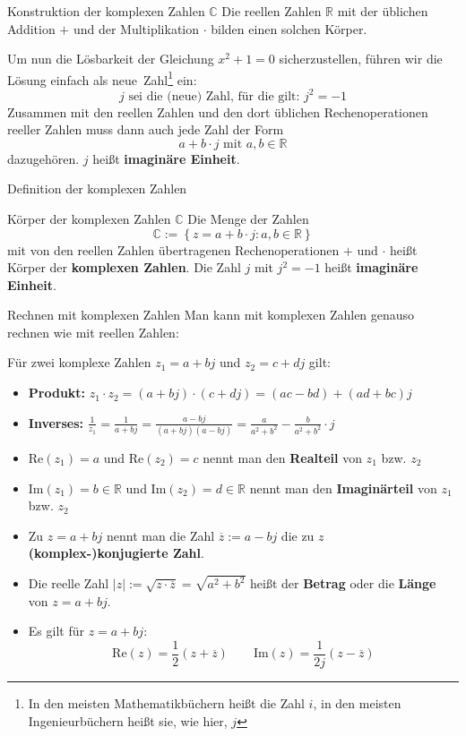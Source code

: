 \begin{frame}{Konstruktion der komplexen Zahlen $\mathbb{C}$}
	Die reellen Zahlen $\mathbb{R}$ mit der üblichen Addition $+$ und der Multiplikation $\cdot$ bilden einen solchen Körper.
	
	Um nun die Lösbarkeit der Gleichung $x^{2}+1=0$ 	sicherzustellen, führen wir die Lösung einfach als \glqq neue\grqq\, Zahl\footnote{In den meisten Mathematikbüchern heißt die Zahl $i$, in den meisten Ingenieurbüchern heißt sie, wie hier, $j$} ein:
	$$
		j \text{ sei die (neue) Zahl, für die gilt: } j^2 = -1
	$$
	Zusammen mit den reellen Zahlen und den dort üblichen Rechenoperationen reeller Zahlen muss dann auch jede Zahl der Form
	$$
		a + b \cdot j \text{ mit } a, b \in \mathbb{R}
	$$
	dazugehören. $j$ heißt \textbf{imaginäre Einheit}.
\end{frame}
\begin{frame}{Definition der komplexen Zahlen}
	\begin{block}{Körper der komplexen Zahlen $\mathbb{C}$}
		Die Menge der Zahlen
		$$
			\mathbb{C} := \left\{ z = a+b\cdot j : a, b \in \mathbb{R}\right\}
		$$
		mit von den reellen Zahlen übertragenen Rechenoperationen $+$ und $\cdot$ heißt Körper der \textbf{komplexen Zahlen}.
		Die Zahl $j$ mit $j^{2} = -1$ heißt \textbf{imaginäre Einheit}.
 	\end{block}
\end{frame}
\begin{frame}{Rechnen mit komplexen Zahlen}
	Man kann mit komplexen Zahlen genauso rechnen wie mit reellen Zahlen:
	
	Für zwei komplexe Zahlen $z_{1} = a+bj$ und $z_{2}=c+dj$ gilt:
	\begin{itemize}
		\item \textbf{Produkt:} $z_{1} \cdot z_{2} = \left(a+bj \right) \cdot \left( c+dj\right) = (ac -bd) + (ad+bc)j$
		\item \textbf{Inverses:} $\frac{1}{z_{1}} = \frac{1}{a+bj} = \frac{a-bj}{(a+bj)(a-bj)} = \frac{a}{a^{2}+b^{2}} - \frac{b}{a^{2}+b^{2}}\cdot j$
		\item $\text{Re}(z_{1}) = a$ und $\text{Re}(z_{2}) = c$ nennt man den \textbf{Realteil} von $z_{1}$ bzw. $z_{2}$
		\item $\text{Im}(z_{1}) = b \in \mathbb{R}$ und $\text{Im}(z_{2}) = d \in \mathbb{R}$ nennt man den \textbf{Imaginärteil} von $z_{1}$ bzw. $z_{2}$
		\item Zu $z=a+bj$ nennt man die Zahl $\overline{z} := a-bj$ die zu $z$ \textbf{(komplex-)konjugierte Zahl}.
		\item Die reelle Zahl $|z| := \sqrt{z\cdot \overline{z}} = \sqrt{a^{2} + b^{2}}$ heißt der \textbf{Betrag} oder die \textbf{Länge} von $z=a+bj$.
		\item Es gilt für $z=a+bj$:
		$$
			\text{Re}(z) = \frac{1}{2}(z+\overline{z}) \qquad \text{Im}(z) = \frac{1}{2j}(z-\overline{z})
		$$
	\end{itemize}
\end{frame}
